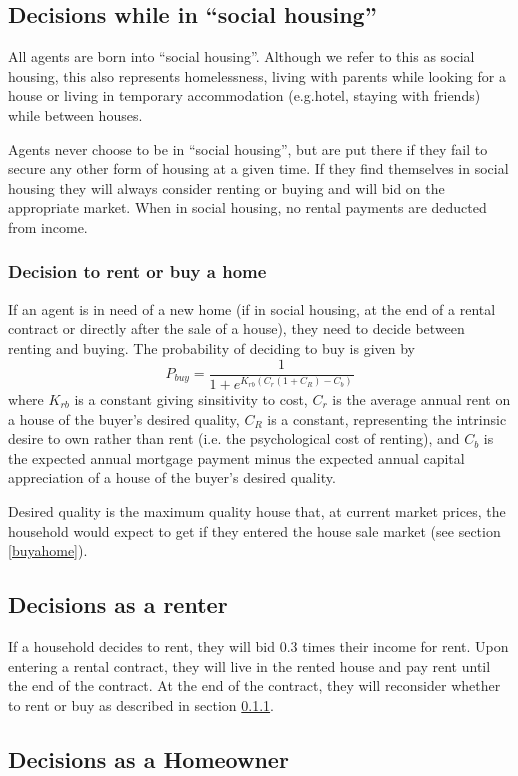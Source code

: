 \documentclass{article}
\begin{document}
\subsection{Decisions while in ``social housing''}
All agents are born into ``social housing''. Although we refer to this as social housing, this also represents homelessness, living with parents while looking for a house or living in temporary accommodation (e.g.hotel, staying with friends) while between houses.

Agents never choose to be in ``social housing'', but are put there if they fail to secure any other form of housing at a given time. If they find themselves in social housing they will always consider renting or buying and will bid on the appropriate market. When in social housing, no rental payments are deducted from income.

\subsubsection{Decision to rent or buy a home}
\label{rentorbuy}
If an agent is in need of a new home (if in social housing, at the end of a rental contract or directly after the sale of a house), they need to decide between renting and buying. The probability of deciding to buy is given by
\[
P_{buy} = \frac{1}{1 + e^{K_{rb}(C_{r}(1+C_R) - C_{b})}}
\]
where $K_{rb}$ is a constant giving sinsitivity to cost, $C_{r}$ is the average annual rent on a house of the buyer's desired quality, $C_R$ is a constant, representing the intrinsic desire to own rather than rent (i.e. the psychological cost of renting), and $C_{b}$ is the expected annual mortgage payment minus the expected annual capital appreciation of a house of the buyer's desired quality.

Desired quality is the maximum quality house that, at current market prices, the household would expect to get if they entered the house sale market (see section \ref{buyahome}).

\subsection{Decisions as a renter}
If a household decides to rent, they will bid 0.3 times their income for rent. Upon entering a rental contract, they will live in the rented house and pay rent until the end of the contract. At the end of the contract, they will reconsider whether to rent or buy as described in section \ref{rentorbuy}.

\subsection{Decisions as a Homeowner}
\end{document}
